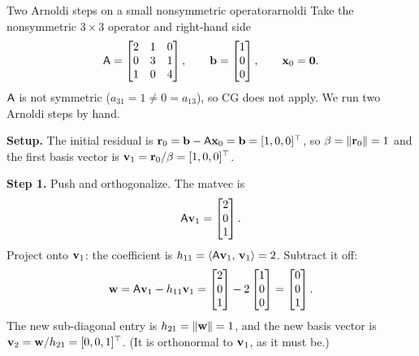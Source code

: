 \begin{workedexample}{Two Arnoldi steps on a small nonsymmetric operator}{arnoldi}
Take the nonsymmetric $3\times3$ operator and right-hand side
\[
  \mathsf{A}=\begin{bmatrix} 2 & 1 & 0\\ 0 & 3 & 1\\ 1 & 0 & 4\end{bmatrix},
  \qquad
  \mathbf{b}=\begin{bmatrix}1\\0\\0\end{bmatrix},
  \qquad \mathbf{x}_0=\mathbf{0}.
\]
$\mathsf{A}$ is not symmetric ($a_{31}=1\ne0=a_{13}$), so CG does not apply. We run two
Arnoldi steps by hand.

\textbf{Setup.} The initial residual is $\mathbf{r}_0=\mathbf{b}-\mathsf{A}\mathbf{x}_0=\mathbf{b}=[1,0,0]^{\top}$,
so $\beta=\lVert\mathbf{r}_0\rVert=1$ and the first basis vector is
$\mathbf{v}_1=\mathbf{r}_0/\beta=[1,0,0]^{\top}$.

\textbf{Step 1.} Push and orthogonalize. The matvec is
\[
  \mathsf{A}\mathbf{v}_1=\begin{bmatrix}2\\0\\1\end{bmatrix}.
\]
Project onto $\mathbf{v}_1$: the coefficient is $h_{11}=\left\langle \mathsf{A}\mathbf{v}_1,\, \mathbf{v}_1\right\rangle=2$.
Subtract it off:
\[
  \mathbf{w}=\mathsf{A}\mathbf{v}_1-h_{11}\mathbf{v}_1=\begin{bmatrix}2\\0\\1\end{bmatrix}
     -2\begin{bmatrix}1\\0\\0\end{bmatrix}=\begin{bmatrix}0\\0\\1\end{bmatrix}.
\]
The new sub-diagonal entry is $h_{21}=\lVert\mathbf{w}\rVert=1$, and the new basis vector is
$\mathbf{v}_2=\mathbf{w}/h_{21}=[0,0,1]^{\top}$. (It is orthonormal to $\mathbf{v}_1$, as it must be.)


\end{workedexample}
